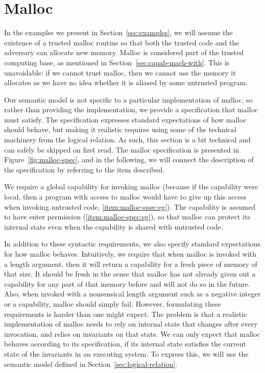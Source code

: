 \documentclass[format=acmsmall, review=true, screen=true]{acmart}
\renewcommand{\figurename}{Figure}
\renewcommand{\sectionname}{Section}
\newenvironment{toplas}{}{}
\begin{document}
\begin{toplas}
  \section{Malloc}
  \label{sec:malloc}
  In the examples we present in \sectionname~\ref{sec:examples}, we will assume
  the existence of a trusted malloc routine so that both the trusted code and
  the adversary can allocate new memory. Malloc is considered part of the
  trusted computing base, as mentioned in
  \sectionname~\ref{sec:capab-mach-with}. This is unavoidable: if we cannot
  trust malloc, then we cannot use the memory it allocates as we have no idea
  whether it is aliased by some untrusted program.

  Our semantic model is not specific to a particular implementation of malloc,
  so rather than providing the implementation, we provide a specification that
  malloc must satisfy. The specification expresses standard expectations of how
  malloc should behave, but making it realistic requires using some of the
  technical machinery from the logical relation. As such, this section is a bit
  technical and can safely be skipped on first read. The malloc specification is
  presented in \figurename~\ref{fig:malloc-spec}, and in the following, we will
  connect the description of the specification by referring to the item
  described.

We require a global capability for
invoking malloc (because if the capability were local, then a program with
access to malloc would have to give up this access when invoking untrusted
code, \ref{item:malloc-spec:eg}). The capability is assumed to have enter
permission (\ref{item:malloc-spec:eg}), so that malloc can
protect its internal state even when the capability is shared with untrusted
code.

In addition to these syntactic requirements, we also specify standard
expectations for how malloc behaves. Intuitively, we require that when malloc is
invoked with a length argument, then it will return a capability for a fresh
piece of memory of that size. It should be fresh in the sense that malloc has
not already given out a capability for any part of that memory before and will
not do so in the future. Also, when invoked with a nonsensical length argument
such as a negative integer or a capability, malloc should simply fail. However,
formulating these requirements is harder than one might expect. The problem is
that a realistic implementation of malloc needs to rely on internal state that
changes after every invocation, and relies on invariants on that state. We can
only expect that malloc behaves according to its specification, if its internal
state satisfies the current state of the invariants in an executing system. To
express this, we will use the semantic model defined in
Section~\ref{sec:logical-relation}.


\end{toplas}
\end{document}
